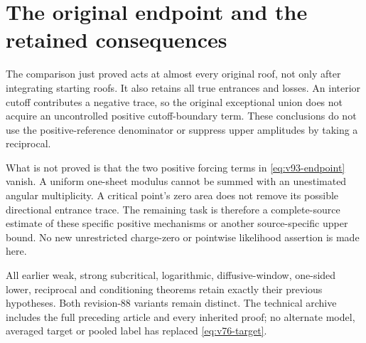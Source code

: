 \documentclass[11pt,reqno]{amsart}
\numberwithin{equation}{section}
\theoremstyle{definition}
\theoremstyle{remark}\newtheorem{remark}[theorem]{Remark}
\begin{document}





\section{The original endpoint and the retained consequences}
The comparison just proved acts at almost every original roof, not
only after integrating starting roofs. It also retains all true
entrances and losses. An interior cutoff contributes a negative trace,
so the original exceptional union does not acquire an uncontrolled
positive cutoff-boundary term. These conclusions do not use the
positive-reference denominator or suppress upper amplitudes by taking
a reciprocal.

What is not proved is that the two positive forcing terms in
\eqref{eq:v93-endpoint} vanish. A uniform one-sheet modulus cannot be
summed with an unestimated angular multiplicity. A critical point's
zero area does not remove its possible directional entrance trace.
The remaining task is therefore a complete-source estimate of these
specific positive mechanisms or another source-specific upper bound.
No new unrestricted charge-zero or pointwise likelihood assertion is
made here.

All earlier weak, strong subcritical, logarithmic, diffusive-window,
one-sided lower, reciprocal and conditioning theorems retain exactly
their previous hypotheses. Both revision-88 variants remain distinct.
The technical archive includes the full preceding article and every
inherited proof; no alternate model, averaged target or pooled label
has replaced \eqref{eq:v76-target}.

\appendix


\end{document}
